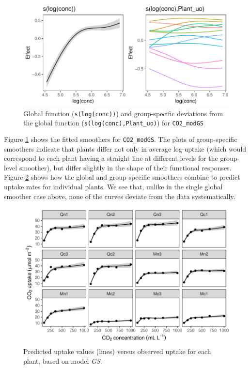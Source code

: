\documentclass[12pt]{article}
\begin{document}
\begin{figure}
\includegraphics[width=\linewidth]{../figures/Fig10} \caption{\label{fig:Fig10}Global function (\texttt{s(log(conc))}) and group-specific deviations from the global function (\texttt{s(log(conc),Plant\_uo)}) for \texttt{CO2\_modGS}}\label{fig:Fig10}
\end{figure}

Figure \ref{fig:Fig10} shows the fitted smoothers for
\texttt{CO2\_modGS}. The plots of group-specific smoothers indicate that
plants differ not only in average log-uptake (which would correspond to
each plant having a straight line at different levels for the
group-level smoother), but differ slightly in the shape of their
functional responses. Figure \ref{fig:Fig11} shows how the global and
group-specific smoothers combine to predict uptake rates for individual
plants. We see that, unlike in the single global smoother case above,
none of the curves deviate from the data systematically.

\begin{figure}
\includegraphics[width=\linewidth]{../figures/Fig11} \caption{\label{fig:Fig11}Predicted uptake values (lines) versus observed uptake for each plant, based on model \emph{GS}.}\label{fig:Fig11}
\end{figure}
\end{document}
